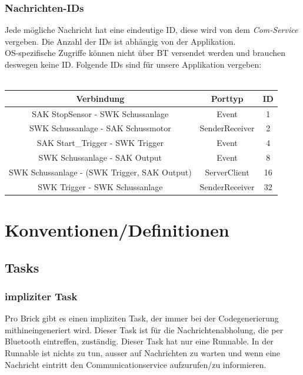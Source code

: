 \documentclass[a4paper,11pt]{scrreprt}
\begin{document}
\subsection{Nachrichten-IDs}
Jede mögliche Nachricht hat eine eindeutige ID, diese wird von dem \textit{Com-Service} vergeben. Die Anzahl der IDs ist abhängig von der Applikation.\\ OS-spezifische Zugriffe können nicht über BT versendet werden und brauchen deswegen keine ID.
Folgende IDs sind für unsere Applikation vergeben:\\~\\
\centering
	\begin{tabular}{|c|c|c|}
	\hline
	\textbf{Verbindung} & \textbf{Porttyp} & \textbf{ID}\\
	\hline
	SAK StopSensor - SWK Schussanlage & Event & 1\\
	SWK Schussanlage - SAK Schussmotor & SenderReceiver & 2\\
	SAK Start\_Trigger - SWK Trigger & Event & 4\\
	SWK Schussanlage - SAK Output & Event & 8\\
	SWK Schussanlage - (SWK Trigger, SAK Output) & ServerClient & 16\\
	SWK Trigger - SWK Schussanlage & SenderReceiver & 32\\
	\hline
	\end{tabular}

\chapter{Konventionen/Definitionen}
\section{Tasks}
\subsection{impliziter Task}
Pro Brick gibt es einen impliziten Task, der immer bei der Codegenerierung mithineingeneriert wird. Dieser Task ist für die Nachrichtenabholung, die per Bluetooth eintreffen, zuständig. Dieser Task hat nur eine Runnable. In der Runnable ist nichts zu tun, ausser auf Nachrichten zu warten und wenn eine Nachricht eintritt den Communicationservice aufzurufen/zu informieren.
\end{document}
